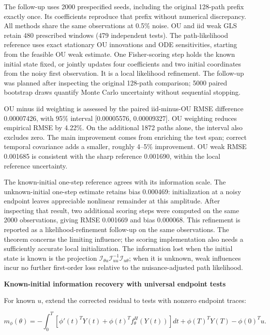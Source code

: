 \documentclass[
  american,
  11pt,
]{article}
\begin{document}
The follow-up uses 2000 prespecified seeds, including the original
128-path prefix exactly once. Its coefficients reproduce that prefix
without numerical discrepancy. All methods share the same observations
at 0.5\% noise. OU and iid weak GLS retain 480 prescribed windows (479
independent tests). The path-likelihood reference uses exact stationary
OU innovations and ODE sensitivities, starting from the feasible OU weak
estimate. One Fisher-scoring step holds the known initial state fixed,
or jointly updates four coefficients and two initial coordinates from
the noisy first observation. It is a local likelihood refinement. The
follow-up was planned after inspecting the original 128-path comparison;
5000 paired bootstrap draws quantify Monte Carlo uncertainty without
sequential stopping.

OU minus iid weighting is assessed by the paired iid-minus-OU RMSE
difference 0.00007426, with 95\% interval {[}0.00005576, 0.00009327{]}.
OU weighting reduces empirical RMSE by 4.22\%. On the additional 1872
paths alone, the interval also excludes zero. The main improvement comes
from enriching the test span; correct temporal covariance adds a
smaller, roughly 4--5\% improvement. OU weak RMSE 0.001685 is consistent
with the sharp reference 0.001690, within the local reference
uncertainty.

The known-initial one-step reference agrees with its information scale.
The unknown-initial one-step estimate retains bias 0.000469:
initialization at a noisy endpoint leaves appreciable nonlinear
remainder at this amplitude. After inspecting that result, two
additional scoring steps were computed on the same 2000 observations,
giving RMSE 0.001669 and bias 0.000068. This refinement is reported as a
likelihood-refinement follow-up on the same observations. The theorem
concerns the limiting influence; the scoring implementation also needs a
sufficiently accurate local initialization. The information lost when
the initial state is known is the projection
\(\mathcal I_{\theta u}\mathcal I_{uu}^{-1}\mathcal I_{u\theta}\); when
it is unknown, weak influences incur no further first-order loss
relative to the nuisance-adjusted path likelihood.

\textbf{Known-initial information recovery with universal endpoint
tests}

For known \(u\), extend the corrected residual to tests with nonzero
endpoint traces:

\[
m_\phi(\theta)=-\int_0^T[\phi'(t)^TY(t)+\phi(t)^Tf_\theta^H(Y(t))]dt
+\phi(T)^TY(T)-\phi(0)^Tu.
\]
\end{document}
